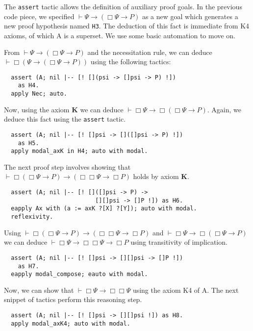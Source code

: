 \documentclass[sigconf]{acmart}
\begin{document}
\noindent The \texttt{assert} tactic allows the definition of
auxiliary proof goals. In the previous code piece, we specified
$\vdash \Psi \to (\Box \Psi \to P)$ as a new goal which
generates a new proof hypothesis named \texttt{H3}. The
deduction of this fact is immediate from K4 axioms, of which A is a superset.
We use some basic automation to move on.

From $\vdash \Psi \to (\Box \Psi \to P)$ and the necessitation
rule, we can deduce $\vdash \Box (\Psi \to (\Box \Psi \to P))$
using the following tactics:
\begin{verbatim}
  assert (A; nil |-- [! [](psi -> []psi -> P) !])
    as H4.
  apply Nec; auto.
\end{verbatim}

\noindent Now, using the axiom \textbf{K} we can deduce $\vdash \Box \Psi \to
\Box (\Box \Psi \to P)$. Again, we deduce this fact using the
\texttt{assert} tactic.

\begin{verbatim}
  assert (A; nil |-- [! []psi -> []([]psi -> P) !])
    as H5.
  apply modal_axK in H4; auto with modal.
\end{verbatim}

\noindent The next proof step involves showing that
$\vdash \Box (\Box \Psi \to P)\to (\Box \Box \Psi \to \Box P)$ holds
by axiom \textbf{K}.

\begin{verbatim}
  assert (A; nil |-- [! []([]psi -> P) ->
                          [][]psi -> []P !]) as H6.
  eapply Ax with (a := axK ?[X] ?[Y]); auto with modal.
  reflexivity.
\end{verbatim}

\noindent Using $\vdash \Box (\Box \Psi \to P)\to (\Box \Box \Psi \to \Box P)$ and
$\vdash \Box \Psi \to\Box (\Box \Psi \to P)$ we can deduce
$\vdash \Box \Psi \to \Box \Box \Psi \to \Box P$ using transitivity of
implication.

\begin{verbatim}
  assert (A; nil |-- [! []psi -> [][]psi -> []P !])
    as H7.
  eapply modal_compose; eauto with modal.
\end{verbatim}

\noindent Now, we can show that $\vdash\Box\Psi\to\Box\Box\Psi$ using
the axiom K4 of A. The next snippet of tactics perform this
reasoning step.

\begin{verbatim}
  assert (A; nil |-- [! []psi -> [][]psi !]) as H8.
  apply modal_axK4; auto with modal.
\end{verbatim}
\end{document}
